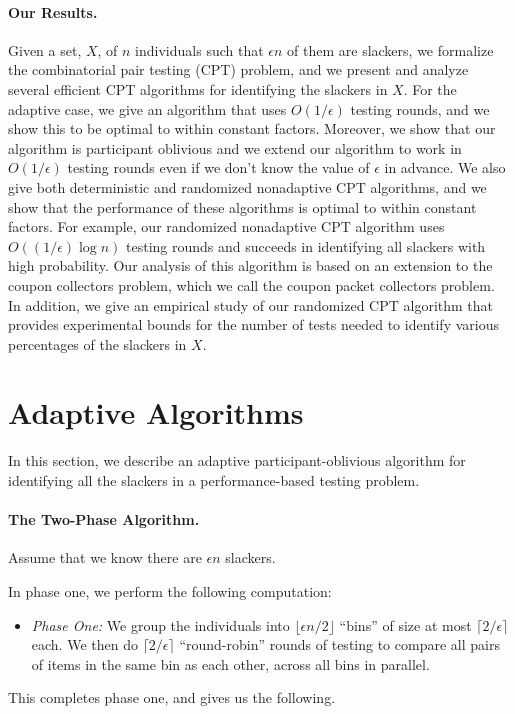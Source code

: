 \documentclass[11pt]{llncs}
\renewcommand{\subsection}[1]{\paragraph{\bf #1.}}
\begin{document}
\subsection{Our Results}
Given a set, $X$, of $n$ individuals such that $\epsilon n$ of them 
are slackers,
we formalize the combinatorial pair testing (CPT) problem,
and we present and analyze several efficient CPT algorithms for identifying
the slackers in $X$.
For the adaptive case, we give an algorithm that uses 
$O(1/\epsilon)$ testing rounds, and we show this to be optimal to within constant factors.
Moreover, we show that our algorithm is participant oblivious
and we extend our algorithm to work in $O(1/\epsilon)$
testing rounds even if we don't know the value of $\epsilon$
in advance.
We also give both deterministic and randomized nonadaptive CPT algorithms, 
and we show that the performance of these algorithms is optimal to
within constant factors.
For example, our randomized nonadaptive CPT algorithm uses 
$O((1/\epsilon)\log n)$ testing rounds and succeeds in identifying all slackers
with high probability.
Our analysis of this algorithm
is based on an extension to the coupon collectors problem,
which we call the coupon packet collectors problem.
In addition, we give an empirical study of our randomized CPT algorithm that
provides experimental bounds for the number of tests needed to identify various
percentages of the slackers in $X$.

\section{Adaptive Algorithms}
In this section, we describe an adaptive participant-oblivious algorithm for identifying all the slackers in a performance-based testing problem.

\subsection{The Two-Phase Algorithm}
Assume that we know
there are $\epsilon n$ slackers.

In phase one, we perform the following computation:
\begin{itemize}
\item
\emph{Phase One:}
We group the individuals into $\lfloor \epsilon n/2\rfloor$ ``bins'' of size 
at most $\lceil 2/\epsilon\rceil$ each.
We then do $\lceil 2/\epsilon\rceil$ 
``round-robin'' rounds of testing to compare all pairs of
items in the same bin as each other, across all bins in parallel. 
\end{itemize}
This completes phase one, and gives us the following.
\end{document}
